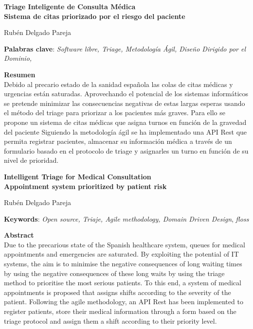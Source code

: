 \thispagestyle{empty}

\begin{center}
	{\large\bfseries Triage Inteligente de Consulta Médica \\ Sistema de citas priorizado por el riesgo del paciente }\\
\end{center}
\begin{center}
	Rubén Delgado Pareja\\
\end{center}


\vspace{0.5cm}
\noindent\textbf{Palabras clave}: \textit{Software libre, Triage, Metodología Ágil, Diseño Dirigido por el Dominio,}
\vspace{0.7cm}

\noindent\textbf{Resumen}\\
Debido al precario estado de la sanidad española las colas de citas médicas y urgencias están saturadas. Aprovechando el potencial de los sistemas informáticos se pretende minimizar las
consecuencias negativas de estas largas esperas usando el método del triage para priorizar a los pacientes más graves. Para ello se propone un sistema de citas médicas que asigna turnos en función de la gravedad del paciente
Siguiendo la metodología ágil se ha implementado una API Rest que permita registrar pacientes, almacenar su información médica a través de un formulario basado en el protocolo de triage y asignarles un turno en función de su nivel de prioridad.

\cleardoublepage

\begin{center}
	{\large\bfseries Intelligent Triage for Medical Consultation \\ Appointment system prioritized by patient risk}\\
\end{center}
\begin{center}
	Rubén Delgado Pareja\\
\end{center}
\vspace{0.5cm}
\noindent\textbf{Keywords}: \textit{Open source, Triaje, Agile methodology, Domain Driven Design}, \textit{floss}
\vspace{0.7cm}

\noindent\textbf{Abstract}\\
Due to the precarious state of the Spanish healthcare system, queues for medical appointments and emergencies are saturated. By exploiting the potential of IT systems, the aim is to minimise the negative consequences of long waiting times by using the
negative consequences of these long waits by using the triage method to prioritise the most serious patients. To this end, a system of medical appointments is proposed that assigns shifts according to the severity of the patient.
Following the agile methodology, an API Rest has been implemented to register patients, store their medical information through a form based on the triage protocol and assign them a shift according to their priority level.

